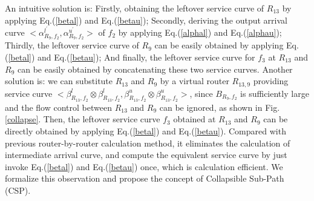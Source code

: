 \documentclass[10pt,journal]{IEEEtran}
\begin{document}
An intuitive solution is: Firstly, obtaining the leftover service curve of $R_{13}$ by applying Eq.(\ref{betal}) and Eq.(\ref{betau}); Secondly, deriving the output arrival curve $<\alpha_{R_{9},f_2}^{l^\prime},\alpha_{R_{9},f_2}^{u^\prime}>$ of $f_2$ by applying Eq.(\ref{alphal}) and Eq.(\ref{alphau}); Thirdly, the leftover service curve of $R_9$ can be easily obtained by applying Eq.(\ref{betal}) and Eq.(\ref{betau}); And finally, the leftover service curve for $f_3$ at $R_{13}$ and $R_9$ can be easily obtained by concatenating these two service curves. Another solution is: we can substitute $R_{13}$ and $R_{9}$ by a virtual router $R_{13,9}$ providing service curve $<\beta_{R_{13},f_2}^l\otimes\beta_{R_{13},f_2}^l,\beta_{R_{13},f_2}^u\otimes\beta_{R_{13},f_2}^u>$, since $B_{R_9,f_2}$ is sufficiently large and the flow control between $R_{13}$ and $R_9$ can be ignored, as shown in Fig. \ref{collapse}. Then, the leftover service curve $f_3$ obtained at $R_{13}$ and $R_{9}$ can be directly obtained by applying Eq.(\ref{betal}) and Eq.(\ref{betau}). Compared with previous router-by-router calculation method, it eliminates the calculation of intermediate arrival curve, and compute the equivalent service curve by just invoke Eq.(\ref{betal}) and Eq.(\ref{betau}) once, which is calculation efficient. We formalize this observation and propose the concept of Collapsible Sub-Path (CSP).
\end{document}

